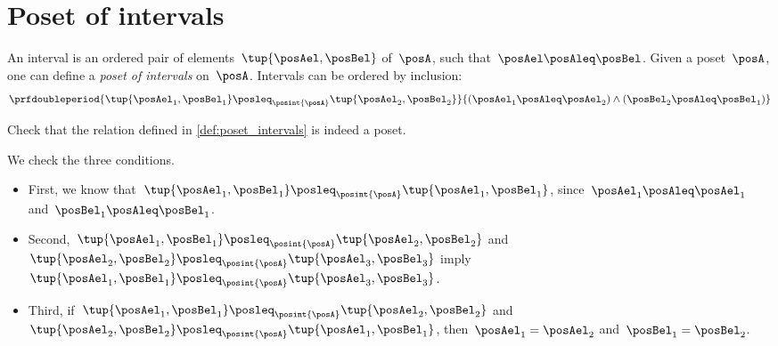 
\section{Poset of intervals}
\begin{definition}
    \label{def:poset_intervals}
    An interval is an ordered pair of elements~$\tup{\posAel,\posBel}$ of~$\posA$, such that~$\posAel \posAleq \posBel$.
    Given a poset~$\posA$, one can define a \emph{poset of intervals} on~$\posA$.
    Intervals can be ordered by inclusion:
    \begin{equation}
        \prfdoubleperiod{\tup{\posAel_1,\posBel_1}\posleq_{\posint{\posA}}\tup{\posAel_2,\posBel_2} }{ (\posAel_1\posAleq \posAel_2)\wedge (\posBel_2\posAleq \posBel_1)}
    \end{equation}
\end{definition}

\begin{exercise}
    Check that the relation defined in \cref{def:poset_intervals} is indeed a poset.
\end{exercise}
\begin{solution}
    We check the three conditions.
    \begin{itemize}
        \item First, we know that~$\tup{\posAel_1,\posBel_1}\posleq_{\posint{\posA}}\tup{\posAel_1,\posBel_1}$, since~$\posAel_1\posAleq \posAel_1$ and~$\posBel_1\posAleq \posBel_1$.
        \item Second,~$\tup{\posAel_1,\posBel_1}\posleq_{\posint{\posA}}\tup{\posAel_2,\posBel_2}$ and~$\tup{\posAel_2,\posBel_2}\posleq_{\posint{\posA}}\tup{\posAel_3,\posBel_3}$ imply $\tup{\posAel_1,\posBel_1}\posleq_{\posint{\posA}}\tup{\posAel_3,\posBel_3}$.
        \item Third, if~$\tup{\posAel_1,\posBel_1}\posleq_{\posint{\posA}}\tup{\posAel_2,\posBel_2}$ and~$\tup{\posAel_2,\posBel_2}\posleq_{\posint{\posA}}\tup{\posAel_1,\posBel_1}$, then~$\posAel_1=\posAel_2$ and~$\posBel_1=\posBel_2$.
    \end{itemize}
\end{solution}
